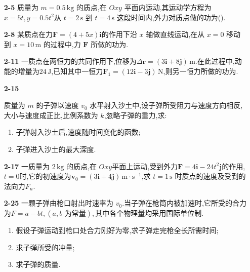 \begin{enumerate}

\item[\textbf{2-5}]
质量为 \(m=0.5\,\mathrm{kg}\) 的质点,在 \(Oxy\) 平面内运动,其运动学方程为$x=5t,y=0.5t^2$从 \(t=2\,\mathrm{s}\) 到 \(t=4\,\mathrm{s}\) 这段时间内,外力对质点做的功为(\hspace{1em}).


\item[\textbf{2-8}]
某质点在力$\boldsymbol{F}=(4+5x)\boldsymbol{i}$的作用下沿 \(x\) 轴做直线运动,在从 \(x=0\) 移动到 \(x=10\,\mathrm{m}\) 的过程中,力 \(\boldsymbol{F}\) 所做的功为\underline{\hspace{2cm}}.


\item[\textbf{2-11}]
一质点在两恒力的共同作用下,位移为$\Delta\boldsymbol{r}=(3\boldsymbol{i}+8\boldsymbol{j})\,\mathrm{m}.$在此过程中,动能的增量为\(24\,\mathrm{J}\),已知其中一恒力$\boldsymbol{F}_1=(12\boldsymbol{i}-3\boldsymbol{j})\,\mathrm{N}$,则另一恒力所做的功为\underline{\hspace{2cm}}.

\item[\textbf{2-15}]

质量为 \(m\) 的子弹以速度 \(v_0\) 水平射入沙土中,设子弹所受阻力与速度方向相反,大小与速度成正比,比例系数为 \(k\),忽略子弹的重力,求:
\begin{enumerate}
	\item 子弹射入沙土后,速度随时间变化的函数;
	\item 子弹进入沙土的最大深度.
\end{enumerate}


\item[\textbf{2-17}]
一质量为 \(2\,\mathrm{kg}\) 的质点,在 \(Oxy\)平面上运动,受到外力$\boldsymbol{F}=4\boldsymbol{i}-24t^2\boldsymbol{j}$的作用,\(t=0\)时,它的初速度为$\boldsymbol{v}_0=(3\boldsymbol{i}+4\boldsymbol{j})\,\mathrm{m\cdot s^{-1}}$,求 \(t=1\,\mathrm{s}\) 时质点的速度及受到的法向力$F_n$.


\item[\textbf{2-25}]
一颗子弹由枪口射出时速率为 \(v_0\).当子弹在枪筒内被加速时,它所受的合力为$F=a-bt,(a,b\text{ 为常量}),$其中各个物理量均采用国际单位制.  
\begin{enumerate}
	\item 假设子弹运动到枪口处合力刚好为零,求子弹走完枪全长所需时间;
	\item 求子弹所受的冲量;
	\item 求子弹的质量.
\end{enumerate}



\end{enumerate}
